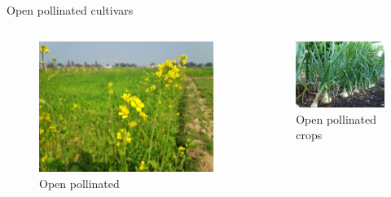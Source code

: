 \documentclass[11pt,ignorenonframetext,aspectratio=169]{beamer}
\newcommand{\bcolumns}{\begin{columns}[T, onlytextwidth]}
\newcommand{\ecolumns}{\end{columns}}
\begin{document}
\begin{frame}{Open pollinated cultivars}
\protect\hypertarget{open-pollinated-cultivars}{}
\bcolumns
{}

\begin{figure}
\includegraphics[width=0.85\linewidth]{./images/cross_pollinated_mustard} \caption{Open pollinated}\label{fig:openpollinated}
\end{figure}


\begin{figure}

{\centering \includegraphics[width=0.9\linewidth]{./images/open_pollinated_onion} 

}

\caption{Open pollinated crops}\label{fig:open-pollinated-onion}
\end{figure}

\ecolumns
\end{frame}
\end{document}
